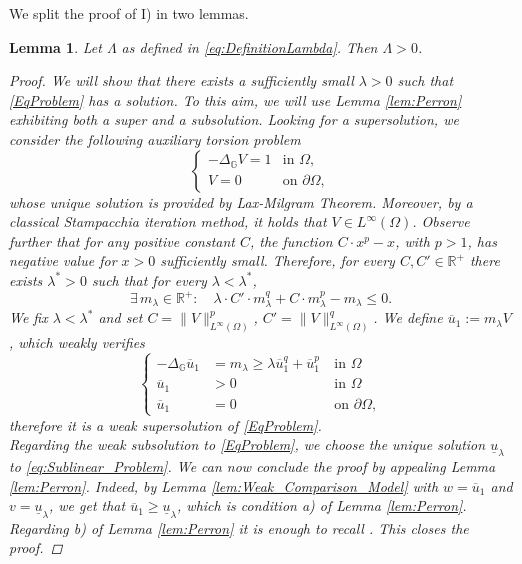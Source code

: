 \documentclass[11pt]{amsart}
\numberwithin{equation}{section} %
\newtheorem{lemma}[teo]{Lemma}
\theoremstyle{definition}
\def\R{\mathbb{R}}
\def\G{\mathbb{G}}
\newcommand{\m}{\mbox}
\newcommand{\de}{\partial}
\begin{document}
\noindent We split the proof of I) in two lemmas. 
\begin{lemma}\label{lem:lambda0}
	Let $\Lambda$ as defined in \eqref{eq:DefinitionLambda}. Then $\Lambda >0$.
	\begin{proof}
		We will show that there exists a sufficiently small $\lambda >0$ such that 
		\eqref{EqProblem} has a solution. To this aim, we will use Lemma \ref{lem:Perron} exhibiting both a super and a subsolution.
		Looking for a supersolution, we consider the following auxiliary torsion problem
		\begin{equation}
			\left\{\begin{array}{rl}
				-\Delta_{\mathbb{G}} V = 1 & \textrm{in } \Omega,\\
				V = 0 & \textrm{on } \partial \Omega,
			\end{array}\right.
		\end{equation}
		\noindent whose unique solution is provided by Lax-Milgram Theorem. Moreover, by a classical Stampacchia iteration method, it holds that $V\in L^{\infty}(\Omega)$. Observe further that for any positive constant $C$,
		the function $C\cdot x^p-x$, with $p>1$, has negative value for $x>0$ sufficiently small.
		Therefore, for every $C,C'\in \R^+$
		there exists $\lambda^*>0$ such that 
		for every $\lambda<\lambda^*$, 
		\[
		\exists \, m_\lambda\in \R^+:\quad \lambda\cdot  C'\cdot m_\lambda^q+C\cdot m_\lambda^p-m_\lambda\leq0.
		\]
		We fix $\lambda<\lambda^*$ and set $C=\|V\|_{L^{\infty}(\Omega)}^p$, $C'=\|V\|_{L^{\infty}(\Omega)}^q$. 
		We define $\overline u_1:=m_\lambda V$, which weakly verifies
		\[
		\left\{\begin{array}{rll}
			-\Delta_{\G}\overline u_1&=m_\lambda \geq \lambda\overline u_1^q+\overline u_1^p &\ \m{in }\Omega\\
			\overline u_1 &>0 &\ \m{in }\Omega\\
			\overline u_1 &=0 &\ \m{on }\de\Omega,
			\end{array}\right.
		\]
				therefore it is a weak supersolution of \eqref{EqProblem}.\\
				Regarding the weak subsolution to \eqref{EqProblem}, we choose the unique solution $\underline u_\lambda$ to \eqref{eq:Sublinear_Problem}. 
				We can now conclude the proof by appealing Lemma \ref{lem:Perron}. Indeed, by Lemma \ref{lem:Weak_Comparison_Model} with $w=\overline{u}_1$ and $v=\underline{u}_{\lambda}$, we get that 
				$\overline{u}_1 \geq \underline{u}_{\lambda}$, which is condition a) of Lemma \ref{lem:Perron}. Regarding b) of Lemma \ref{lem:Perron} it is enough to recall \cite[Corollary 2.3]{BiGaVe}. This closes the proof.				
	\end{proof}
\end{lemma}
\end{document}
